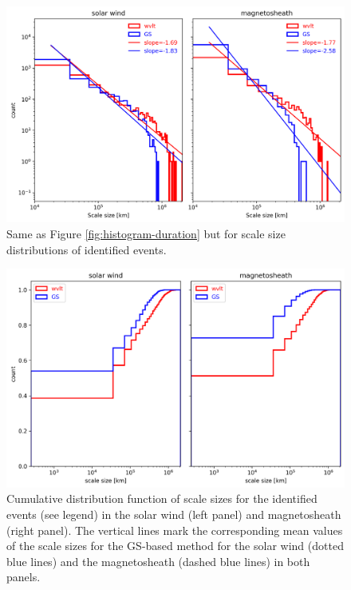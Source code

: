 \begin{figure}
    \centering
    \includegraphics[width=\textwidth]{Figures/Histograms/histogram_scalesize.png}
    \caption[Histograms of scale size for identified events]{Same as Figure \ref{fig:histogram-duration} but for scale size distributions of identified events.}
    \label{fig:histogram-scalesize}
\end{figure}

\begin{figure}
    \centering
    \includegraphics[width=\textwidth]{Figures/Histograms/cdf_scalesize.png}
    \caption[Cumulative distribution function of scale sizes for the identified events]{Cumulative distribution function of scale sizes for the identified events (see legend) in the solar wind (left panel) and magnetosheath (right panel). The vertical lines mark the corresponding mean values of the scale sizes for the GS-based method for the solar wind (dotted blue lines) and the magnetosheath (dashed blue lines) in both panels.}
    \label{fig:cdf-scalesize}
\end{figure}

